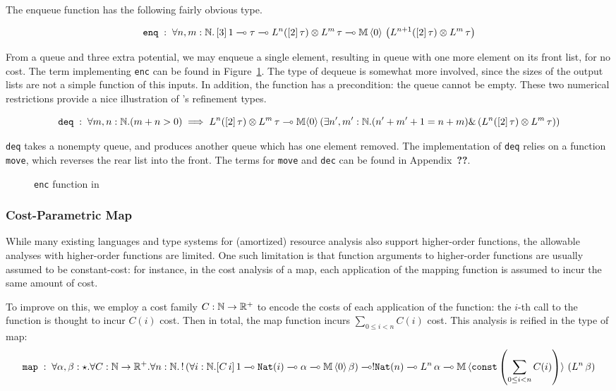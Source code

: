 The enqueue function has the following fairly obvious type.

$$
\texttt{enq} \; : \; \forall n,m : \mathbb{N}. \, [3] \, 1 \multimap \tau \multimap L^n([2] \, \tau) \otimes L^m \, \tau \multimap \mathbb{M} \, \langle 0 \rangle \, \left(L^{n+1}([2] \, \tau) \otimes L^m \, \tau\right)
$$

From a queue and three extra potential, we may enqueue a single element, resulting in queue with one more element on its front list, for no cost. The term implementing \texttt{enc} can be found in Figure~\ref{fig:example-dlambdaamor-enc}. The type of dequeue is somewhat more involved, since the sizes of the output lists are not a simple function of this inputs. In addition, the function has a precondition: the queue cannot be empty. These two numerical restrictions provide a nice illustration of \dlambdaamor's refinement types.

$$
\texttt{deq} \; : \; \forall m,n : \mathbb{N}. (m + n > 0) \implies L^n([2] \, \tau) \otimes L^m \, \tau \multimap \mathbb{M} \langle 0 \rangle \left(\exists n',m' : \mathbb{N}. (n' + m' + 1 = n + m) \& \left(L^n([2] \, \tau) \otimes L^m \, \tau\right)\right)
$$

\texttt{deq} takes a nonempty queue, and produces another queue which has one element removed. The implementation of \texttt{deq} relies on a function \texttt{move}, which reverses the rear list into the front. The terms for \texttt{move} and \texttt{dec} can be found in Appendix~\textbf{??}.


\begin{figure}
\label{fig:example-dlambdaamor-enc}
\caption{\texttt{enc} function in \dlambdaamor}
\end{figure}

\subsubsection{Cost-Parametric Map}
While many existing languages and type systems for (amortized) resource analysis also support higher-order functions, the allowable analyses with higher-order functions are limited. One such limitation is that function arguments to higher-order functions are usually assumed to be constant-cost: for instance, in the cost analysis of a map, each application of the mapping function is assumed to incur the same amount of cost.

To improve on this, we employ a cost family $C : \mathbb{N} \to \mathbb{R}^+$ to encode the costs of each application of the function: the $i$-th call to the function is thought to incur $C(i)$ cost. Then in total, the map function incurs $\sum_{0 \leq i < n} C(i)$ cost. This analysis is reified in the type of map:
$$
\texttt{map} \; : \; \forall \alpha,\beta : \star. \forall C : \mathbb{N} \to \mathbb{R}^+. \forall n : \mathbb{N}. \, !\left(\forall i : \mathbb{N}. [C \, i] \, 1 \multimap \texttt{Nat}(i) \multimap \alpha \multimap \mathbb{M} \, \langle 0 \rangle\,  \beta\right)
\multimap !\texttt{Nat}(n)
\multimap L^n \,\alpha \multimap \mathbb{M} \, \langle \texttt{const}\left(\sum_{0 \leq i < n} C(i)\right) \rangle\, \left(L^n \, \beta\right)
$$

